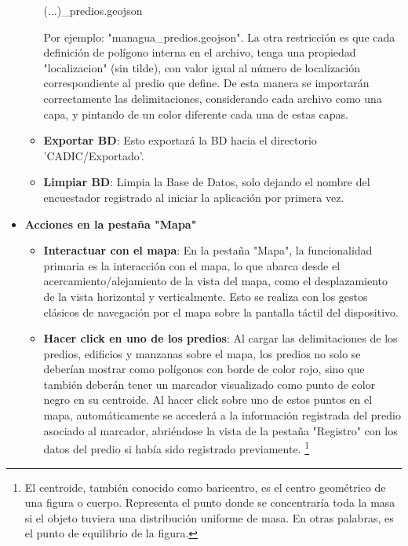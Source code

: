 \begin{itemize}
\begin{itemize}
                    \begin{mdframed}
                        (...)\_predios.geojson
                    \end{mdframed}
                    Por ejemplo: "managua\_predios.geojson". La otra restricción es que cada definición de polígono interna en el archivo,
                    tenga una propiedad "localizacion" (sin tilde), con valor igual al número de localización correspondiente al predio que define.
                    De esta manera se importarán correctamente las delimitaciones, considerando cada archivo como una capa, y pintando de un color
                    diferente cada una de estas capas.

              \item \textbf{Exportar BD}: Esto exportará la BD hacia el directorio 'CADIC/Exportado'.
              \item \textbf{Limpiar BD}: Limpia la Base de Datos, solo dejando el nombre del encuestador registrado al iniciar la aplicación por primera vez.
          \end{itemize}
    \item \textbf{Acciones en la pestaña "Mapa"}
          \begin{itemize}
              \item \textbf{Interactuar con el mapa}: En la pestaña "Mapa", la funcionalidad primaria es la interacción con el mapa, lo que abarca desde
                    el acercamiento/alejamiento de la vista del mapa, como el desplazamiento de la vista horizontal y verticalmente. Esto se realiza con
                    los gestos clásicos de navegación por el mapa sobre la pantalla táctil del dispositivo.
              \item \textbf{Hacer click en uno de los predios}: Al cargar las delimitaciones de los predios, edificios y manzanas sobre el mapa,
                    los predios no solo se deberían mostrar como polígonos con borde de color rojo, sino que también deberán tener un marcador visualizado
                    como punto de color negro en su centroide. Al hacer click sobre uno de estos puntos en el mapa, automáticamente se accederá a la información
                    registrada del predio asociado al marcador, abriéndose la vista de la pestaña "Registro" con los datos del predio si había sido registrado previamente.
                    \footnote{El centroide, también conocido como baricentro, es el centro geométrico de una figura o cuerpo. Representa el punto donde se concentraría toda
                        la masa si el objeto tuviera una distribución uniforme de masa. En otras palabras, es el punto de equilibrio de la figura. }


\end{itemize}
\end{itemize}

